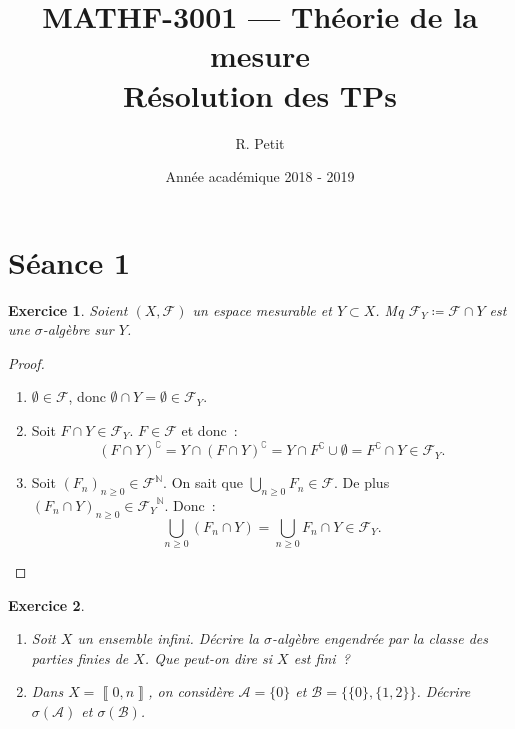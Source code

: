 \documentclass{article}
\title{MATHF-3001 --- Théorie de la mesure \\Résolution des TPs}
\author{R. Petit}
\date{Année académique 2018 - 2019}
\newtheorem{ex}{Exercice}[section]
\newcommand{\C}{\complement}
\newcommand{\N}{{\mathbb N}}
\newcommand{\intint}[2]{\left\llbracket#1, #2\right\rrbracket}
\begin{document}
\maketitle

\section{Séance 1}

\begin{ex} Soient $(X, \mathcal F)$ un espace mesurable et $Y \subset X$. Mq $\mathcal F_Y \coloneqq \mathcal F \cap Y$ est une $\sigma$-algèbre sur $Y$.
\end{ex}

\begin{proof}~
\begin{enumerate}
	\item $\emptyset \in \mathcal F$, donc $\emptyset \cap Y = \emptyset \in \mathcal F_Y$.
	\item Soit $F \cap Y \in \mathcal F_Y$. $F \in \mathcal F$ et donc~:
	\[(F \cap Y)^\C = Y \cap (F \cap Y)^\C = Y \cap F^\C \cup \emptyset = F^\C \cap Y \in \mathcal F_Y.\]
	\item Soit $(F_n)_{n \geq 0} \in \mathcal F^\N$. On sait que $\bigcup_{n \geq 0}F_n \in \mathcal F$. De plus $(F_n \cap Y)_{n \geq 0} \in {\mathcal F_Y}^\N$. Donc~:
	\[\bigcup_{n \geq 0}(F_n \cap Y) = \bigcup_{n \geq 0}F_n \cap Y \in \mathcal F_Y.\]
\end{enumerate}
\end{proof}

\begin{ex}~
\begin{enumerate}
	\item Soit $X$ un ensemble infini. Décrire la $\sigma$-algèbre engendrée par la classe des parties finies de $X$. Que peut-on dire si $X$ est fini~?
	\item Dans $X = \intint 0n$, on considère $\mathcal A = \{0\}$ et $\mathcal B = \{\{0\}, \{1, 2\}\}$. Décrire $\sigma(\mathcal A)$ et $\sigma(\mathcal B)$.
\end{enumerate}
\end{ex}
\end{document}
